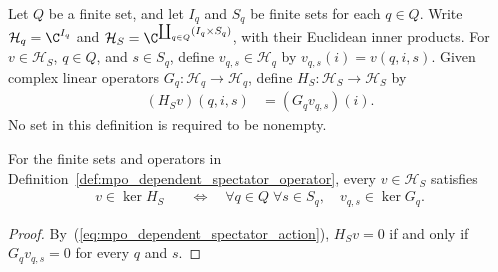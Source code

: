 \begin{definition}
    \label{def:mpo_dependent_spectator_operator}
    \leanok
    Let $Q$ be a finite set, and let $I_q$ and $S_q$ be finite sets for each
    $q\in Q$.  Write $\mathcal H_q=\C^{I_q}$ and
    $\mathcal H_S=\C^{\coprod_{q\in Q}(I_q\times S_q)}$, with their Euclidean
    inner products.  For $v\in\mathcal H_S$, $q\in Q$, and $s\in S_q$, define
    $v_{q,s}\in\mathcal H_q$ by $v_{q,s}(i)=v(q,i,s)$.
    Given complex linear operators $G_q:\mathcal H_q\to\mathcal H_q$, define
    $H_S:\mathcal H_S\to\mathcal H_S$ by
    \begin{align}
        (H_Sv)(q,i,s) & =(G_qv_{q,s})(i).
        \label{eq:mpo_dependent_spectator_action}
    \end{align}
    No set in this definition is required to be nonempty.
\end{definition}

\begin{lemma}
    \label{thm:mpo_dependent_spectator_kernel}
    \leanok
    For the finite sets and operators in
    Definition~\ref{def:mpo_dependent_spectator_operator}, every
    $v\in\mathcal H_S$ satisfies
    \begin{align}
        v\in\ker H_S
         & \quad\Longleftrightarrow\quad
        \forall q\in Q\;\forall s\in S_q,\quad v_{q,s}\in\ker G_q.
    \end{align}
\end{lemma}
\begin{proof}
    \leanok
    By~(\ref{eq:mpo_dependent_spectator_action}), $H_Sv=0$ if and only if
    $G_qv_{q,s}=0$ for every $q$ and $s$.
\end{proof}


